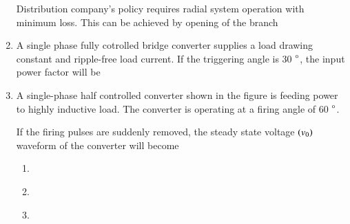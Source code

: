 \documentclass[journal,12pt,onecolumn]{IEEEtran}
\theoremstyle{remark}
\begin{document}
\begin{enumerate}
		Distribution company's policy requires radial system operation with minimum loss. This can be achieved by opening of the branch 
		\begin{enumerate}
		\end{enumerate}
	\item A single phase fully cotrolled bridge converter supplies a load drawing constant and ripple-free load current. If the triggering angle is 30 $\degree$, the input power factor will be
		\begin{enumerate}
				\begin{multicols}{4}
				\item 0.65
				\item 0.78
				\item 0.85
				\item 0.866
				\end{multicols}
		\end{enumerate}
	\item A single-phase half controlled converter shown in the figure is feeding power to highly inductive load. The converter is operating at a firing angle of 60 $\degree$.
			\begin{figure}[H]
			\centering
			
			\caption{}
			\label{25}
		\end{figure}

		If the firing pulses are suddenly removed, the steady state voltage $\left(v_0\right)$ waveform of the converter will become
		\begin{enumerate}
			\item
					\begin{figure}[H]
			\centering
			
			\caption{}
			\label{25}
		\end{figure}

			\item
					\begin{figure}[H]
			\centering
			
			\caption{}
			\label{25}
		\end{figure}

			\item
					\begin{figure}[H]
			\centering
			
			\caption{}
			\label{25}
		\end{figure}


\end{enumerate}
\end{enumerate}
\end{document}

